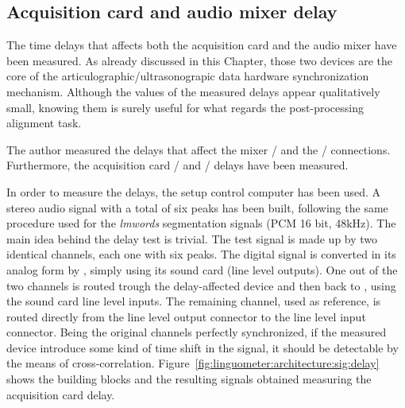 \subsection{Acquisition card and audio mixer delay}
\label{sec:linguometer:technical:delay}
The time delays that affects both the acquisition card and the 
audio mixer have been measured.
As already discussed in this Chapter, those two devices are the core of the
articulographic/ultrasonograpic data hardware synchronization mechanism.
Although the values of the measured delays appear qualitatively small, knowing 
them is surely useful for what regards the post-processing alignment task.

The author measured the delays that affect the  mixer
/ and the
/ connections.
Furthermore, the   acquisition card
/ and
/ delays have been measured.

In order to measure the delays, the setup control computer  has been 
used.
A stereo audio signal with a total of six peaks has been built, 
following the same procedure used for the \emph{lmwords} segmentation signals
(PCM 16 bit, 48kHz).
The main idea behind the delay test is trivial. The test signal is made up by
two identical channels, each one with six peaks.
The digital signal is converted in its analog form by , simply using
its sound card (line level outputs).
One out of the two channels is routed trough the delay-affected device and then
back to , using the sound card line level inputs.
The remaining channel, used as reference, is routed directly
from the line level output connector to the line level input connector.
Being the original channels perfectly synchronized, if the measured device
introduce some kind of time shift in the signal, it should be detectable by the
means of cross-correlation.
Figure~\ref{fig:linguometer:architecture:sig:delay} shows the building blocks
and the resulting signals obtained measuring the acquisition card delay.

